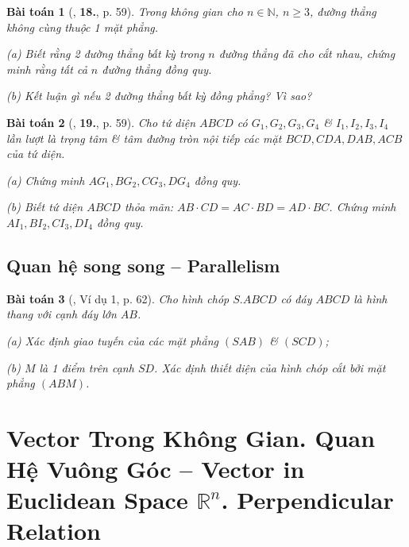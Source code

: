 \documentclass{article}
\numberwithin{equation}{section}
\newtheorem{baitoan}{Bài toán}[section]
\begin{document}
\begin{baitoan}[\cite{TL_chuyen_Toan_Hinh_Hoc_11}, \textbf{18.}, p. 59]
	Trong không gian cho $n\in\mathbb{N}$, $n\ge 3$, đường thẳng không cùng thuộc 1 mặt phẳng.
	\begin{enumerate*}
		\item[(a)] Biết rằng 2 đường thẳng bất kỳ trong $n$ đường thẳng đã cho cắt nhau, chứng minh rằng tất cả $n$ đường thẳng đồng quy.
		\item[(b)] Kết luận gì nếu 2 đường thẳng bất kỳ đồng phẳng? Vì sao?
	\end{enumerate*}
\end{baitoan}

\begin{baitoan}[\cite{TL_chuyen_Toan_Hinh_Hoc_11}, \textbf{19.}, p. 59]
	Cho tứ diện $ABCD$ có $G_1,G_2,G_3,G_4$ \& $I_1,I_2,I_3,I_4$ lần lượt là trọng tâm \& tâm đường tròn nội tiếp các mặt $BCD,CDA,DAB,ACB$ của tứ diện. 
	\begin{enumerate*}
		\item[(a)] Chứng minh $AG_1,BG_2,CG_3,DG_4$ đồng quy.
		\item[(b)] Biết tứ diện $ABCD$ thỏa mãn: $AB\cdot CD = AC\cdot BD = AD\cdot BC$. Chứng minh $AI_1,BI_2,CI_3,DI_4$ đồng quy.
	\end{enumerate*}
\end{baitoan}


\subsection{Quan hệ song song -- Parallelism}

\begin{baitoan}[\cite{TL_chuyen_Toan_Hinh_Hoc_11}, Ví dụ 1, p. 62]
	Cho hình chóp $S.ABCD$ có đáy $ABCD$ là hình thang với cạnh đáy lớn $AB$.
	\begin{enumerate*}
		\item[(a)] Xác định giao tuyến của các mặt phẳng $(SAB)$ \& $(SCD)$;
		\item[(b)] $M$ là 1 điểm trên cạnh $SD$. Xác định thiết diện của hình chóp cắt bởi mặt phẳng $(ABM)$.
	\end{enumerate*}
\end{baitoan}


\section{Vector Trong Không Gian. Quan Hệ Vuông Góc -- Vector in Euclidean Space $\mathbb{R}^n$. Perpendicular Relation}
\end{document}
